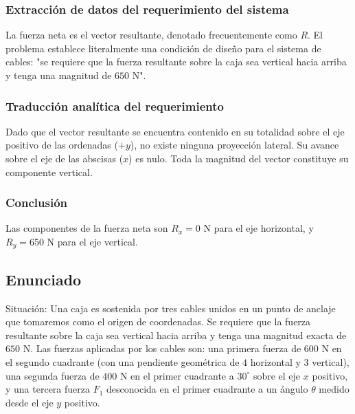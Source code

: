 \documentclass[12pt, a4paper]{article}
\begin{document}
\subsubsection*{Extracción de datos del requerimiento del sistema}
La fuerza neta es el vector resultante, denotado frecuentemente como $R$. El problema establece literalmente una condición de diseño para el sistema de cables: "se requiere que la fuerza resultante sobre la caja sea vertical hacia arriba y tenga una magnitud de $650 \text{ N}$".

\subsubsection*{Traducción analítica del requerimiento}
Dado que el vector resultante se encuentra contenido en su totalidad sobre el eje positivo de las ordenadas ($+y$), no existe ninguna proyección lateral. Su avance sobre el eje de las abscisas ($x$) es nulo. Toda la magnitud del vector constituye su componente vertical.

\subsubsection*{Conclusión}
Las componentes de la fuerza neta son $R_x = 0 \text{ N}$ para el eje horizontal, y $R_y = 650 \text{ N}$ para el eje vertical.

\newpage
\subsection*{Enunciado}
Situación: Una caja es sostenida por tres cables unidos en un punto de anclaje que tomaremos como el origen de coordenadas. Se requiere que la fuerza resultante sobre la caja sea vertical hacia arriba y tenga una magnitud exacta de $650 \text{ N}$. Las fuerzas aplicadas por los cables son: una primera fuerza de $600 \text{ N}$ en el segundo cuadrante (con una pendiente geométrica de $4$ horizontal y $3$ vertical), una segunda fuerza de $400 \text{ N}$ en el primer cuadrante a $30^\circ$ sobre el eje $x$ positivo, y una tercera fuerza $F_1$ desconocida en el primer cuadrante a un ángulo $\theta$ medido desde el eje $y$ positivo.

\begin{center}
\end{center}
\end{document}
